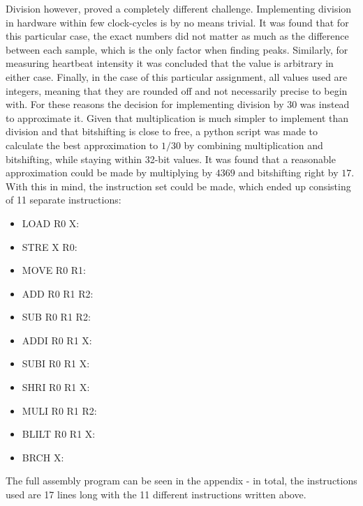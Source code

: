 \documentclass[12pt,a4paper]{article}
\begin{document}
	Division however, proved a completely different challenge. Implementing division in hardware within few clock-cycles is by no means trivial. It was found that for this particular case, the exact numbers did not matter as much as the difference between each sample, which is the only factor when finding peaks. Similarly, for measuring heartbeat intensity it was concluded that the value is arbitrary in either case. Finally, in the case of this particular assignment, all values used are integers, meaning that they are rounded off and not necessarily precise to begin with. For these reasons the decision for implementing division by 30 was instead to approximate it.
	Given that multiplication is much simpler to implement than division and that bitshifting is close to free, a python script was made to calculate the best approximation to $1/30$ by combining multiplication and bitshifting, while staying within 32-bit values.
	It was found that a reasonable approximation could be made by multiplying by $4369$ and bitshifting right by $17$. With this in mind, the instruction set could be made, which ended up consisting of 11 separate instructions:\\
	
	\begin{itemize}
			
			\item LOAD R0 X: \qquad[$R0=mem(X)$]
			\item STRE X R0: \;\qquad[$mem(X)=R0$]
			\item MOVE R0 R1: \,\,\quad[$R0=R1$]
			\item ADD R0 R1 R2: \quad[$R0=R1+R2$]
			\item SUB R0 R1 R2: \quad[$R0=R1-R2$]
			\item ADDI R0 R1 X: \quad[$R0=R1+X$]
			\item SUBI R0 R1 X: \quad[$R0=R1-X$]
			\item SHRI R0 R1 X: \quad[$R0=R1>>X$]
			\item MULI R0 R1 R2: \quad[$R0=R1*R2$]
			\item BLILT R0 R1 X: \quad[$if\;(R0>R1)\;goto\;X$]
			\item BRCH X: \qquad\qquad[$goto\;X$]
		\end{itemize}
	The full assembly program can be seen in the appendix - in total, the instructions used are 17 lines long with the 11 different instructions written above.
\end{document}
